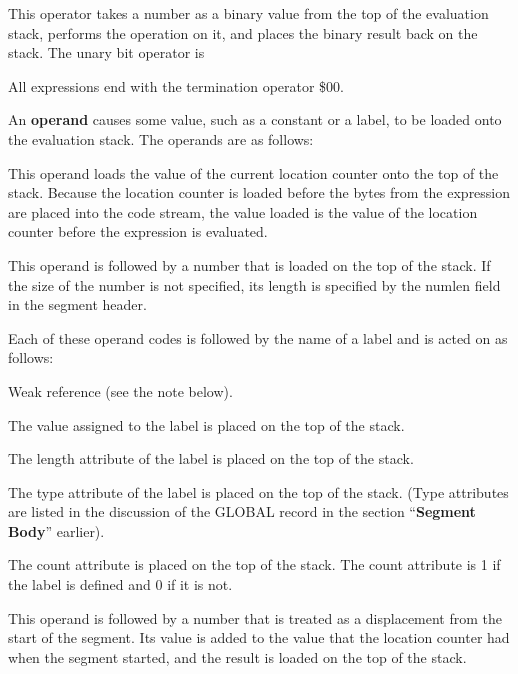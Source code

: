 \medskip\begingroup\parskip=0pt
\endgroup

 This operator takes a number as a binary
value from the top of the evaluation stack, performs the operation on it,
and places the binary result back on the stack. The unary bit operator is

\medskip\begingroup\parskip=0pt
\endgroup

 All expressions end with the termination
operator \$00.

\description
An {\bf operand} causes some value, such as a constant or a label, to be
loaded onto the evaluation stack. The operands are as follows:

 This operand loads the value
of the current location counter onto the top of the stack. Because the
location counter is loaded before the bytes from the expression are placed
into the code stream, the value loaded is the value of the location counter
before the expression is evaluated.

 This operand is followed by a number
that is loaded on the top of the stack. If the size of the number is not
specified, its length is specified by the {\omf numlen} field in the
segment header.

 Each of these operand
codes is followed by the name of a label and is acted on as follows:

 Weak reference (see the note below).

 The value assigned to the label is placed on the top of the
stack.

 The length attribute of the label is placed on the top of the
stack.

 The type attribute of the label is placed on the top of the
stack. (Type attributes are listed in the discussion of the {\omf GLOBAL}
record in the section ``{\bf Segment Body}'' earlier).

 The count attribute is placed on the top of the stack. The
count attribute is 1 if the label is defined and 0 if it is not.

 This operand is followed by a
number that is treated as a displacement from the start of the segment. Its
value is added to the value that the location counter had when the segment
started, and the result is loaded on the top of the stack.

